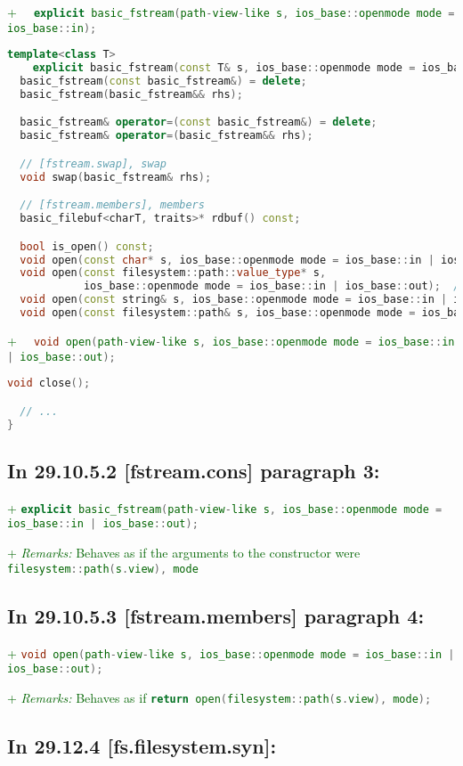 \documentclass[11pt]{article}
\newcommand{\code}[2][cpp]{\lstinline[language=#1,basicstyle=\small\ttfamily]{#2}}
\newcommand{\desc}[1]{\textit{#1}}
\newcommand{\remarks}{\desc{Remarks: }}
\newcommand{\tsrefp}[3]{\subsection*{In #2 \textbf{[#1]} paragraph #3:}}
\newcommand{\tsref}[2]{\subsection*{In #2 \textbf{[#1]}:}}
\newcommand{\tsreplace}[3]{\textcolor{red}{\sout{#1}}#2\textcolor{darkgreen}{#3}}
\begin{document}
\tsreplace{}{}{+ \code{  explicit basic_fstream(path-view-like s,
ios_base::openmode mode = ios_base::in);}}

\begin{lstlisting}[language=cpp]
  template<class T>
    explicit basic_fstream(const T& s, ios_base::openmode mode = ios_base::in | ios_base::out);
  basic_fstream(const basic_fstream&) = delete;
  basic_fstream(basic_fstream&& rhs);

  basic_fstream& operator=(const basic_fstream&) = delete;
  basic_fstream& operator=(basic_fstream&& rhs);

  // [fstream.swap], swap
  void swap(basic_fstream& rhs);

  // [fstream.members], members
  basic_filebuf<charT, traits>* rdbuf() const;

  bool is_open() const;
  void open(const char* s, ios_base::openmode mode = ios_base::in | ios_base::out);
  void open(const filesystem::path::value_type* s,
            ios_base::openmode mode = ios_base::in | ios_base::out);  // wide systems only; see [fstream.syn]
  void open(const string& s, ios_base::openmode mode = ios_base::in | ios_base::out);
  void open(const filesystem::path& s, ios_base::openmode mode = ios_base::in | ios_base::out);
\end{lstlisting}

\tsreplace{}{}{+ \code{  void open(path-view-like s, ios_base::openmode mode = ios_base::in | ios_base::out);}}

\begin{lstlisting}[language=cpp]
  void close();

  // ...
}
\end{lstlisting}


\tsrefp{fstream.cons}{29.10.5.2}{3}

\tsreplace{}{}{+ \code{explicit basic_fstream(path-view-like s, ios_base::openmode mode = ios_base::in | ios_base::out);}}

\tsreplace{}{}{+ \remarks Behaves as if the arguments to the constructor were \code{filesystem::path(s.view), mode}}


\tsrefp{fstream.members}{29.10.5.3}{4}

\tsreplace{}{}{+ \code{void open(path-view-like s, ios_base::openmode mode = ios_base::in | ios_base::out);}}

\tsreplace{}{}{+ \remarks Behaves as if \code{return open(filesystem::path(s.view), mode);}}


\tsref{fs.filesystem.syn}{29.12.4}
\end{document}
